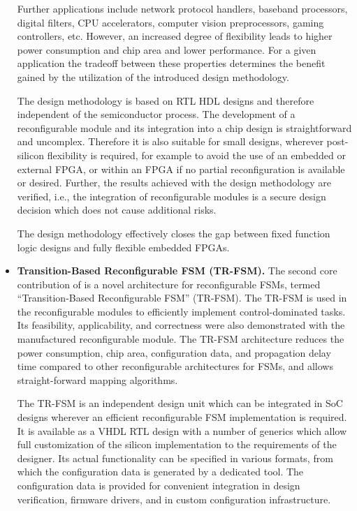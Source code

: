 \documentclass[a4paper,12pt,onsided]{article}
\begin{document}
\begin{itemize}
    Further applications include network protocol handlers, baseband
    processors, digital filters, CPU accelerators, computer
    vision preprocessors, gaming controllers, etc.
    However, an increased degree of flexibility leads
    to higher power consumption and chip area and lower performance.
    For a given application the tradeoff between these properties determines
    the benefit gained by the utilization of the introduced design methodology.


    The design methodology is based on RTL HDL designs and therefore
    independent of the semiconductor process.
    The development of a reconfigurable module and its integration into a chip
    design is straightforward and uncomplex.
    Therefore it is also suitable for small designs, wherever post-silicon
    flexibility is required, for example to avoid the use of an embedded or
    external FPGA, or within an FPGA if no partial reconfiguration is available
    or desired.
    Further, the results achieved with the design methodology are verified, i.e., the
    integration of reconfigurable modules is a secure design decision which
    does not cause additional risks.

    The design methodology effectively closes the gap between fixed function
    logic designs and fully flexible embedded FPGAs.

  \item \textbf{Transition-Based Reconfigurable FSM (TR-FSM).}
    The second core contribution of \cite{Gla15} is a novel architecture for
    reconfigurable FSMs, termed ``Tran\-si\-ti\-on-Based Reconfigurable FSM''
    (TR-FSM).
    The TR-FSM is used in the reconfigurable modules to efficiently implement
    control-dominated tasks.
    Its feasibility, applicability, and correctness were also demonstrated with
    the manufactured reconfigurable module.
    The TR-FSM architecture reduces the power consumption, chip area,
    configuration data, and propagation delay time compared to other
    reconfigurable architectures for FSMs, and allows straight-forward mapping
    algorithms.

    The TR-FSM is an independent design unit which can be integrated in SoC
    designs wherever an efficient reconfigurable FSM implementation is
    required.
    It is available as a VHDL RTL design with a number of generics which allow
    full customization of the silicon implementation to the requirements of
    the designer.
    Its actual functionality can be specified in various formats, from which the
    configuration data is generated by a dedicated tool. The configuration data
    is provided for convenient integration in design verification, firmware
    drivers, and in custom configuration infrastructure.
\end{itemize}

\vfill



\end{document}
